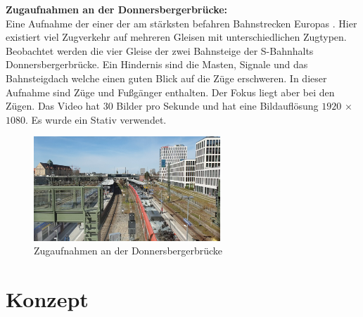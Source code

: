 \documentclass[conference]{IEEEtran}
\begin{document}
	\textbf{Zugaufnahmen an der Donnersbergerbrücke:}\\
	Eine Aufnahme der einer der am stärksten befahren Bahnstrecken Europas \cite{z1}. Hier existiert viel Zugverkehr auf mehreren Gleisen mit unterschiedlichen Zugtypen. Beobachtet werden die vier Gleise der zwei Bahnsteige der S-Bahnhalts Donnersbergerbrücke. Ein Hindernis sind die Masten, Signale und das Bahnsteigdach welche einen guten Blick auf die Züge erschweren. In dieser Aufnahme sind Züge und Fußgänger enthalten. Der Fokus liegt aber bei den Zügen. Das Video hat 30 Bilder pro Sekunde und hat eine Bildauflösung $1920$ × $1080$. Es wurde ein Stativ verwendet.
	\begin{figure}[!h]
		\begin{center}
			\includegraphics[width=7cm]{Media/DonnersbergerRaw.png}
			\caption{Zugaufnahmen an der Donnersbergerbrücke}
			\label{BrudermuhlRaw}
		\end{center}
	\end{figure}
	
	\section{Konzept}
	
\end{document}
